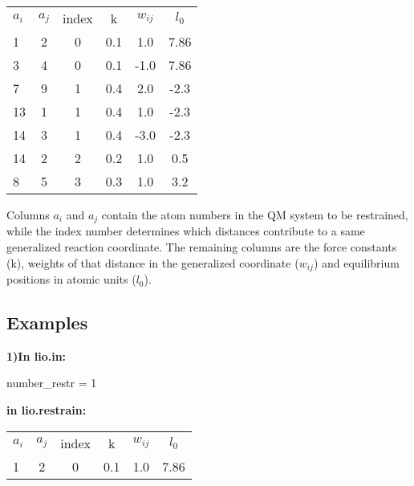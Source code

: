     \begin{table}  [H]
      \begin{center}
      \begin{tabular}{ l c c c c c}
         $a_i$ & $a_j$ & index &   k  &    $w_{ij}$   &  $l_0$    \\
         1  &  2 &   0   &  0.1 &    1.0   & 7.86   \\
         3  &  4 &   0   &  0.1 &   -1.0   & 7.86   \\
         7  &  9 &   1   &  0.4 &    2.0   & -2.3   \\
         13 &  1 &   1   &  0.4 &    1.0   & -2.3   \\
         14 &  3 &   1   &  0.4 &   -3.0   & -2.3   \\
         14 &  2 &   2   &  0.2 &    1.0   & 0.5    \\
         8  &  5 &   3   &  0.3 &    1.0   & 3.2    \\
       \end{tabular}
       \end{center}
      \label{lio.restrain}
    \end{table}

Columns $a_i$ and $a_j$ contain the atom numbers in the QM system to be restrained, while the index number determines which distances contribute to a same generalized reaction coordinate. The remaining columns are the force constants (k), weights of that distance in the generalized coordinate ($w_{ij}$) and equilibrium positions in atomic units ($l_0$).

    \subsection{Examples}

    \textbf{1)In lio.in:}
    
    number\_restr = 1
    
        \textbf{in lio.restrain:}

    \begin{table}  [H]
      \begin{center}
      \begin{tabular}{ l c c c c c}
         $a_i$ & $a_j$ & index &   k  &    $w_{ij}$   &  $l_0$   \\
         1  &  2 &   0   &  0.1 &    1.0   & 7.86   \\
       \end{tabular}
       \end{center}
      \label{Tex1}
    \end{table}

